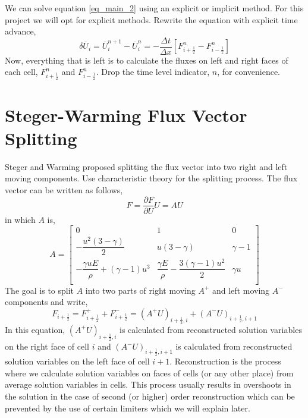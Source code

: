 \documentclass{article}
\begin{document}
We can solve equation \ref{eq_main_2} using an explicit or implicit method. For this project we will opt for explicit methods. Rewrite the equation with explicit time advance,
\begin{equation}
\label{eq_main_3}
\delta \overline{U}_i =\overline{U}_i^{n+1}-\overline{U}_i^{n}=- \dfrac{\Delta t}{\Delta x} \left[F_{i+\frac{1}{2}}^{n}-F_{i-\frac{1}{2}}^{n} \right]
\end{equation}
Now, everything that is left is to calculate the fluxes on left and right faces of each cell, $F_{i+\frac{1}{2}}^{n}$ and  $F_{i-\frac{1}{2}}^{n}$. Drop the time level indicator, $n$, for convenience.

\section{Steger-Warming Flux Vector Splitting}
Steger and Warming proposed splitting the flux vector into two right and left moving components. Use characteristic theory for the splitting process. The flux vector can be written as follows,
\begin{equation*}
F=\dfrac{\partial F}{\partial U} U = AU
\end{equation*}
in which $A$ is,
\begin{equation*}
A=
\left[
\begin{matrix}
0 & 1 & 0 \\[10pt]
-\dfrac{u^2 (3-\gamma)}{2} & u(3-\gamma)& \gamma-1\\[10pt]
-\dfrac{\gamma u E}{\rho} +(\gamma-1) u^3 & \dfrac{\gamma E}{\rho}-\dfrac{3(\gamma-1) u^2}{2} & \gamma u\\
\end{matrix}
\right]
\end{equation*}
The goal is to split $A$ into two parts of right moving $A^+$ and left moving $A^-$ components and write,
\begin{equation}
\label{eq_flux_split_steger_1}
F_{i+\frac{1}{2}} = F_{i+\frac{1}{2}}^+ +F_{i+\frac{1}{2}}^- = \left(A^+ U\right)_{{i+\frac{1}{2}},i}+\left(A^- U\right)_{{i+\frac{1}{2}},i+1}
\end{equation}
In this equation, $\left(A^+ U\right)_{{i+\frac{1}{2}},i}$ is calculated from reconstructed solution variables on the right face of cell $i$ and $\left(A^- U\right)_{{i+\frac{1}{2}},i+1}$ is calculated from reconstructed solution variables on the left face of cell $i+1$. Reconstruction is the process where we calculate solution variables on faces of cells (or any other place) from average solution variables in cells. This process usually results in overshoots in the solution in the case of second (or higher) order reconstruction which can be prevented by the use of certain limiters which we will explain later.
\end{document}
